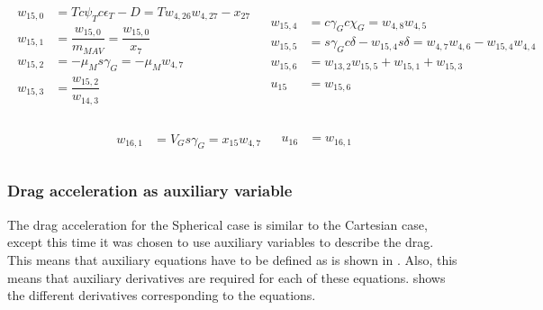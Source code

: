 \begin{align} \label{eq:auxF15}
\begin{split}
w_{15,0} &= T c\psi_{T} c\epsilon_{T}-D = Tw_{4,26}w_{4,27}-x_{27} \\
w_{15,1} &= \dfrac{w_{15,0}}{m_{MAV}} = \dfrac{w_{15,0}}{x_{7}} \\
w_{15,2} &= -\mu_{M} s\gamma_{G} = -\mu_{M}w_{4,7} \\
w_{15,3} &= \dfrac{w_{15,2}}{w_{14,3}} \\
\end{split}
&
\begin{split}
w_{15,4} &= c\gamma_{G}c\chi_{G} = w_{4,8}w_{4,5} \\
w_{15,5} &= s\gamma_{G} c\delta - w_{15,4} s\delta = w_{4,7}w_{4,6}-w_{15,4}w_{4,4} \\
w_{15,6} &= w_{13,2}w_{15,5}+w_{15,1}+w_{15,3} \\
\\
u_{15} &= w_{15,6} \\
\end{split}
\end{align}

\begin{align} \label{eq:auxF16}
\begin{split}
w_{16,1} &= V_{G} s\gamma_{G} = x_{15}w_{4,7} \\
\end{split}
&
\begin{split}
u_{16} &= w_{16,1} \\
\end{split}
\end{align}




 
 \subsubsection{Drag acceleration as auxiliary variable}
 \label{subsubsec:tsiDragAuxE}
The drag acceleration for the Spherical case is similar to the Cartesian case, except this time it was chosen to use auxiliary variables to describe the drag. This means that auxiliary equations have to be defined as is shown in . Also, this means that auxiliary derivatives are required for each of these equations.  shows the different derivatives corresponding to the equations.
 
